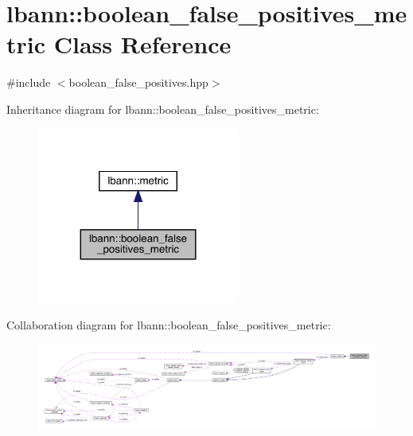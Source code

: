 \hypertarget{classlbann_1_1boolean__false__positives__metric}{}\section{lbann\+:\+:boolean\+\_\+false\+\_\+positives\+\_\+metric Class Reference}
\label{classlbann_1_1boolean__false__positives__metric}


{\ttfamily \#include $<$boolean\+\_\+false\+\_\+positives.\+hpp$>$}



Inheritance diagram for lbann\+:\+:boolean\+\_\+false\+\_\+positives\+\_\+metric\+:\nopagebreak
\begin{figure}[H]
\begin{center}
\leavevmode
\includegraphics[width=188pt]{classlbann_1_1boolean__false__positives__metric__inherit__graph}
\end{center}
\end{figure}


Collaboration diagram for lbann\+:\+:boolean\+\_\+false\+\_\+positives\+\_\+metric\+:\nopagebreak
\begin{figure}[H]
\begin{center}
\leavevmode
\includegraphics[width=350pt]{classlbann_1_1boolean__false__positives__metric__coll__graph}
\end{center}
\end{figure}
